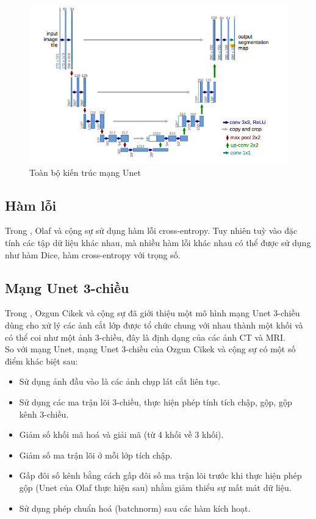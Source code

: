 \begin{figure}[h]
\centering
    \includegraphics[totalheight=9.5cm]{Images/unet.png}
    \caption{Toàn bộ kiến trúc mạng Unet}
    \label{skip_conn}
\end{figure}

\subsection{Hàm lỗi}
Trong \cite{unet_paper}, Olaf và cộng sự sử dụng hàm lỗi cross-entropy. Tuy nhiên tuỳ vào đặc tính các tập dữ liệu khác nhau, mà nhiều hàm lỗi khác nhau có thể được sử dụng như hàm Dice, hàm cross-entropy với trọng số.

\subsection{Mạng Unet 3-chiều}
Trong \cite{3DUnet}, Ozgun Cikek và cộng sự đã giới thiệu một mô hình mạng Unet 3-chiều dùng cho xử lý các ảnh cắt lớp được tổ chức chung với nhau thành một khối và có thể coi như một ảnh 3-chiều, đây là định dạng của các ảnh CT và MRI.\\
So với mạng Unet, mạng Unet 3-chiều của Ozgun Cikek và cộng sự có một số điểm khác biệt sau:
\begin{itemize}
    \item Sử dụng ảnh đầu vào là các ảnh chụp lát cắt liên tục.
    \item Sử dụng các ma trận lõi 3-chiều, thực hiện phép tính tích chập, gộp, gộp kênh 3-chiều.
    \item Giảm số khối mã hoá và giải mã (từ 4 khối về 3 khối).
    \item Giảm số ma trận lõi ở mỗi lớp tích chập.
    \item Gấp đôi số kênh bằng cách gấp đôi số ma trận lõi trước khi thực hiện phép gộp (Unet của Olaf thực hiện sau) nhằm giảm thiểu sự mất mát dữ liệu.
    \item Sử dụng phép chuẩn hoá (batchnorm) sau các hàm kích hoạt.
\end{itemize}

